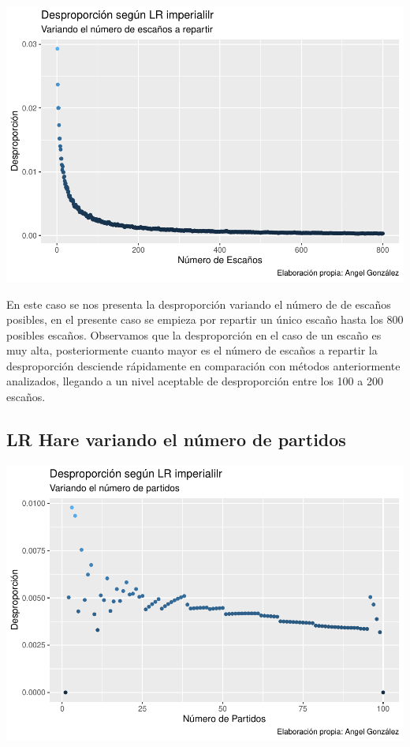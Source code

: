 \documentclass[12pt,a4paper,]{book}
\numberwithin{dummy}{section}
\theoremstyle{ocrenumbox}
\theoremstyle{blacknumex}
\theoremstyle{blacknumbox}
\theoremstyle{ocrenum}
\theoremstyle{ocrenum}
\begin{document}
\begin{center}\includegraphics[width=0.95\linewidth]{figurasR/unnamed-chunk-51-1} \end{center}

En este caso se nos presenta la desproporción variando el número de de
escaños posibles, en el presente caso se empieza por repartir un único
escaño hasta los 800 posibles escaños. Observamos que la desproporción
en el caso de un escaño es muy alta, posteriormente cuanto mayor es el
número de escaños a repartir la desproporción desciende rápidamente en
comparación con métodos anteriormente analizados, llegando a un nivel
aceptable de desproporción entre los 100 a 200 escaños.

\hypertarget{lr-hare-variando-el-nuxfamero-de-partidos}{%
\subsection{LR Hare variando el número de
partidos}\label{lr-hare-variando-el-nuxfamero-de-partidos}}

\begin{center}\includegraphics[width=0.95\linewidth]{figurasR/unnamed-chunk-52-1} \end{center}
\end{document}
